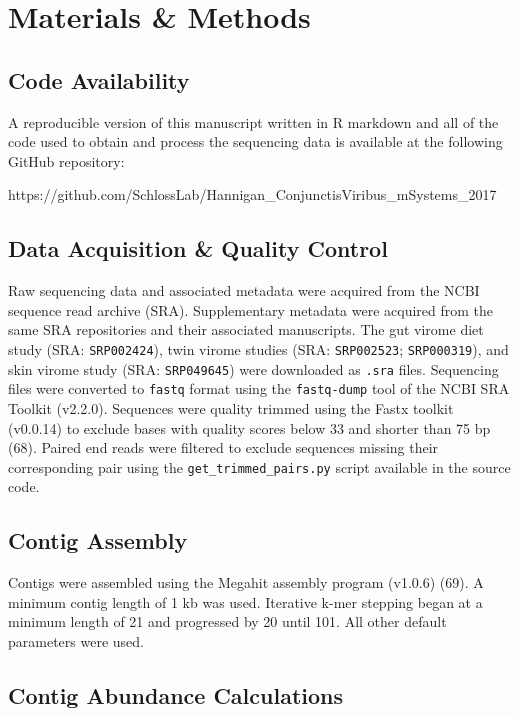 \documentclass[12pt,]{article}
\begin{document}
\section{Materials \& Methods}\label{materials-methods}

\subsection{Code Availability}\label{code-availability}

A reproducible version of this manuscript written in R markdown and all
of the code used to obtain and process the sequencing data is available
at the following GitHub repository:

https://github.com/SchlossLab/Hannigan\_ConjunctisViribus\_mSystems\_2017

\subsection{Data Acquisition \& Quality
Control}\label{data-acquisition-quality-control}

Raw sequencing data and associated metadata were acquired from the NCBI
sequence read archive (SRA). Supplementary metadata were acquired from
the same SRA repositories and their associated manuscripts. The gut
virome diet study (SRA: \texttt{SRP002424}), twin virome studies (SRA:
\texttt{SRP002523}; \texttt{SRP000319}), and skin virome study (SRA:
\texttt{SRP049645}) were downloaded as \texttt{.sra} files. Sequencing
files were converted to \texttt{fastq} format using the
\texttt{fastq-dump} tool of the NCBI SRA Toolkit (v2.2.0). Sequences
were quality trimmed using the Fastx toolkit (v0.0.14) to exclude bases
with quality scores below 33 and shorter than 75 bp (68). Paired end
reads were filtered to exclude sequences missing their corresponding
pair using the \texttt{get\_trimmed\_pairs.py} script available in the
source code.

\subsection{Contig Assembly}\label{contig-assembly}

Contigs were assembled using the Megahit assembly program (v1.0.6) (69).
A minimum contig length of 1 kb was used. Iterative k-mer stepping began
at a minimum length of 21 and progressed by 20 until 101. All other
default parameters were used.

\subsection{Contig Abundance
Calculations}\label{contig-abundance-calculations}
\end{document}
